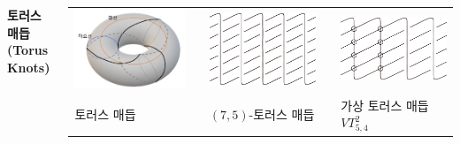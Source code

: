 \documentclass[25pt, a0paper, portrait, margin=0mm, innermargin=15mm,
     blockverticalspace=15mm, colspace=15mm, subcolspace=8mm]{tikzposter}
\def\mysection#1{\textbf{\Large\color{NTNUBlue}\sf #1}\par}
\def\myem#1{\textsf{\color{BrickRed}#1}}
\begin{document}
\begin{columns}
\block{}
{
\bigskip\bigskip
\mysection{토러스 매듭(Torus Knots)}
\bigskip
\begin{center}
\begin{tabu} to .9\linewidth{X[3,m,c] X[.2,m,c] X[3,m,c] X[.2,m,c] X[3,m,c]}
\includegraphics[width=\linewidth]{torus1}
 &  &
\includegraphics[width=\linewidth]{torus2}
 &  &
\includegraphics[width=\linewidth]{vt542}\\
\myem{토러스 매듭}
 &  &
\myem{$(7,5)$-토러스 매듭}
 &  &
\myem{가상 토러스 매듭 $VT_{5,4}^2$}
\end{tabu}
\end{center}


}
\end{columns}
\end{document}

